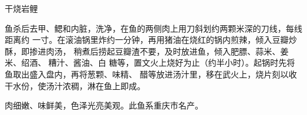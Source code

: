 %
%
%
%
%
%
%
\begin{recipe}{干烧岩鲤}

\ingredients


\preparation

鱼杀后去甲、鳃和内脏，洗净，在鱼的两侧肉上用刀斜划约两颗米深的刀线，每线距离约
一寸。在滚油锅里炸约一分钟，再用猪油在烧红的锅内煎辣，倾入豆瓣炒酥，即掺进肉汤，
稍煮后捞起豆瓣渣不要，及时放进鱼，倾入肥膘、蒜米、姜米、绍酒、𰪿糟汁、酱油、白
糖等，置文火上烧好为止（约半小时）。起锅时先将鱼取出盛入盘内，再将葱颗、味精、
醋等放进汤汁里，移在武火上，烧片刻以收干水份，使汤汁浓稠，淋在鱼上即成。

\features

肉细嫩、味鲜美，色泽光亮美观。此鱼系重庆市名产。

\end{recipe}

